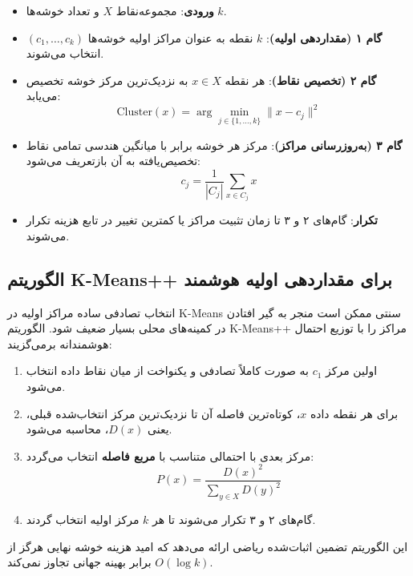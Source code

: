 \begin{algorithmbox}
\begin{itemize}
    \item \textbf{ورودی}: مجموعه‌نقاط $X$ و تعداد خوشه‌ها $k$.
    \item \textbf{گام ۱ (مقداردهی اولیه)}: $k$ نقطه به عنوان مراکز اولیه خوشه‌ها $(c_1, \dots, c_k)$ انتخاب می‌شوند.
    \item \textbf{گام ۲ (تخصیص نقاط)}: هر نقطه $x \in X$ به نزدیک‌ترین مرکز خوشه تخصیص می‌یابد:
    \begin{equation}
    \text{Cluster}(x) = \arg\min_{j \in \{1, \dots, k\}} \|x - c_j\|^2
    \end{equation}
    \item \textbf{گام ۳ (به‌روزرسانی مراکز)}: مرکز هر خوشه برابر با میانگین هندسی تمامی نقاط تخصیص‌یافته به آن بازتعریف می‌شود:
    \begin{equation}
    c_j = \frac{1}{|C_j|} \sum_{x \in C_j} x
    \end{equation}
    \item \textbf{تکرار}: گام‌های ۲ و ۳ تا زمان تثبیت مراکز یا کمترین تغییر در تابع هزینه تکرار می‌شوند.
\end{itemize}
\end{algorithmbox}

\subsection{الگوریتم K-Means++ برای مقداردهی اولیه هوشمند}
انتخاب تصادفی ساده مراکز اولیه در K-Means سنتی ممکن است منجر به گیر افتادن در کمینه‌های محلی بسیار ضعیف شود. الگوریتم K-Means++ مراکز را با توزیع احتمال هوشمندانه برمی‌گزیند:
\begin{enumerate}
    \item اولین مرکز $c_1$ به صورت کاملاً تصادفی و یکنواخت از میان نقاط داده انتخاب می‌شود.
    \item برای هر نقطه داده $x$، کوتاه‌ترین فاصله آن تا نزدیک‌ترین مرکز انتخاب‌شده قبلی، یعنی $D(x)$، محاسبه می‌شود.
    \item مرکز بعدی با احتمالی متناسب با \textbf{مربع فاصله} انتخاب می‌گردد:
    \begin{equation}
    P(x) = \frac{D(x)^2}{\sum_{y \in X} D(y)^2}
    \end{equation}
    \item گام‌های ۲ و ۳ تکرار می‌شوند تا هر $k$ مرکز اولیه انتخاب گردند.
\end{enumerate}
این الگوریتم تضمین اثبات‌شده ریاضی ارائه می‌دهد که امید هزینه خوشه نهایی هرگز از $O(\log k)$ برابر بهینه جهانی تجاوز نمی‌کند.

